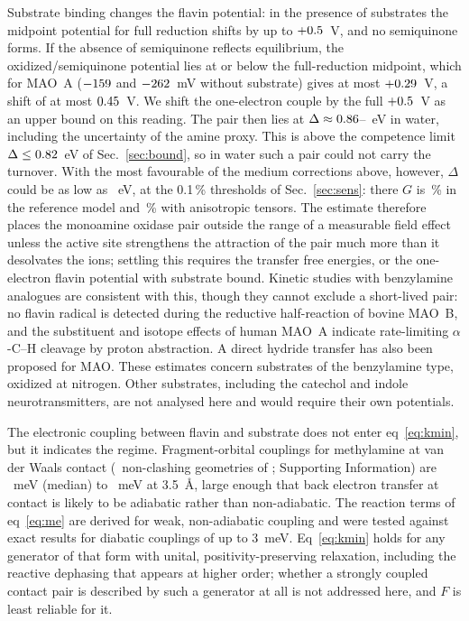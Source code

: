 \documentclass[aip,jcp,amsmath,amssymb,reprint]{revtex4-1}
\begin{document}
Substrate binding changes the flavin potential: in the presence of substrates
the midpoint potential for full reduction shifts by up to $+0.5$~V, and no
semiquinone forms.\cite{Sablin2001} If the absence of semiquinone reflects
equilibrium, the oxidized/semiquinone potential lies at or below the
full-reduction midpoint, which for MAO~A ($-159$ and $-262$~mV without
substrate) gives at most $+0.29$~V, a shift of at most $0.45$~V.
We shift the one-electron couple by the full $+0.5$~V as an upper bound on
this reading. The pair then lies at $\Delta\approx0.86$--\DeltaMAOsubHi~eV
in water, including the uncertainty of the amine proxy. This is above the
competence limit $\Delta\le0.82$~eV of Sec.~\ref{sec:bound}, so in water
such a pair could not carry the turnover. With the most favourable of the medium
corrections above, however, $\Delta$ could be as low as \DeltaSiteLo~eV, at the
0.1\,\% thresholds of Sec.~\ref{sec:sens}: there $G$ is \GsiteRef\,\% in the
reference model and \GsiteAniso\,\% with anisotropic tensors. The estimate therefore
places the monoamine oxidase pair outside the range of a measurable field effect
unless the active site strengthens the attraction of the pair much more than it
desolvates the ions; settling this requires the transfer free energies, or the
one-electron flavin potential with substrate bound. Kinetic studies with benzylamine
analogues are consistent with this, though they cannot exclude a short-lived
pair: no flavin radical is detected during the reductive half-reaction of bovine
MAO~B,\cite{Walker1994} and the substituent and isotope effects of human MAO~A
indicate rate-limiting $\alpha$-C--H cleavage by proton
abstraction.\cite{Miller1999} A direct hydride transfer has also been proposed
for MAO.\cite{Kay2007} These estimates concern substrates of the benzylamine
type, oxidized at nitrogen. Other substrates, including the catechol and indole
neurotransmitters, are not analysed here and would require their own
potentials.

The electronic coupling between flavin and substrate does not enter
eq~\ref{eq:kmin}, but it indicates the regime. Fragment-orbital
couplings\cite{Valeev2006} for
methylamine at van der Waals contact (\nScanValid\ non-clashing geometries of
\nScan; Supporting Information) are \tContactMed~meV (median) to
\tContactMax~meV at 3.5~\AA, large enough that back electron transfer at contact
is likely to be adiabatic rather than non-adiabatic.\cite{Marcus1985} The reaction
terms of eq~\ref{eq:me} are derived for weak, non-adiabatic coupling and were
tested against exact results for diabatic couplings of up to 3~meV.\cite{Fay2018} Eq~\ref{eq:kmin} holds for any generator
of that form with unital, positivity-preserving relaxation, including the
reactive dephasing that appears at higher order; whether a strongly coupled
contact pair is described by such a generator at all is not addressed here, and
$F$ is least reliable for it.
\end{document}
